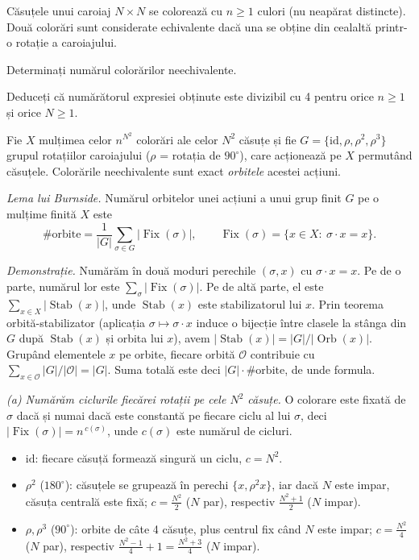 \begin{problema}[Clasică]
Căsuțele unui caroiaj $N \times N$ se colorează cu $n \ge 1$ culori (nu neapărat distincte). Două colorări sunt considerate echivalente dacă una se obține din cealaltă printr-o rotație a caroiajului.
\begin{parti}
\item Determinați numărul colorărilor neechivalente.
\item Deduceți că numărătorul expresiei obținute este divizibil cu 4 pentru orice $n \ge 1$ și orice $N \ge 1$.
\end{parti}
\end{problema}

\begin{solutie}
Fie $X$ mulțimea celor $n^{N^2}$ colorări ale celor $N^2$ căsuțe și fie $G = \{\mathrm{id}, \rho, \rho^2, \rho^3\}$ grupul rotațiilor caroiajului ($\rho$ = rotația de $90^\circ$), care acționează pe $X$ permutând căsuțele. Colorările neechivalente sunt exact \emph{orbitele} acestei acțiuni.

\emph{Lema lui Burnside.} Numărul orbitelor unei acțiuni a unui grup finit $G$ pe o mulțime finită $X$ este
\[
\#\text{orbite} = \frac{1}{|G|} \sum_{\sigma \in G} \bigl|\operatorname{Fix}(\sigma)\bigr|,
\qquad
\operatorname{Fix}(\sigma) = \{x \in X :\ \sigma \cdot x = x\}.
\]

\emph{Demonstrație.} Numărăm în două moduri perechile $(\sigma, x)$ cu $\sigma \cdot x = x$. Pe de o parte, numărul lor este $\sum_{\sigma} |\operatorname{Fix}(\sigma)|$. Pe de altă parte, el este $\sum_{x \in X} |\operatorname{Stab}(x)|$, unde $\operatorname{Stab}(x)$ este stabilizatorul lui $x$. Prin teorema orbită-stabilizator (aplicația $\sigma \mapsto \sigma \cdot x$ induce o bijecție între clasele la stânga din $G$ după $\operatorname{Stab}(x)$ și orbita lui $x$), avem $|\operatorname{Stab}(x)| = |G|/|\operatorname{Orb}(x)|$. Grupând elementele $x$ pe orbite, fiecare orbită $\mathcal{O}$ contribuie cu $\sum_{x \in \mathcal{O}} |G|/|\mathcal{O}| = |G|$. Suma totală este deci $|G| \cdot \#\text{orbite}$, de unde formula.

\emph{(a) Numărăm ciclurile fiecărei rotații pe cele $N^2$ căsuțe.} O colorare este fixată de $\sigma$ dacă și numai dacă este constantă pe fiecare ciclu al lui $\sigma$, deci $|\operatorname{Fix}(\sigma)| = n^{\,c(\sigma)}$, unde $c(\sigma)$ este numărul de cicluri.

\begin{itemize}
\item[---] $\mathrm{id}$: fiecare căsuță formează singură un ciclu, $c = N^2$.
\item[---] $\rho^2$ ($180^\circ$): căsuțele se grupează în perechi $\{x, \rho^2 x\}$, iar dacă $N$ este impar, căsuța centrală este fixă; $c = \frac{N^2}{2}$ ($N$ par), respectiv $\frac{N^2+1}{2}$ ($N$ impar).
\item[---] $\rho, \rho^3$ ($90^\circ$): orbite de câte 4 căsuțe, plus centrul fix când $N$ este impar; $c = \frac{N^2}{4}$ ($N$ par), respectiv $\frac{N^2-1}{4} + 1 = \frac{N^2+3}{4}$ ($N$ impar).
\end{itemize}


\end{solutie}
